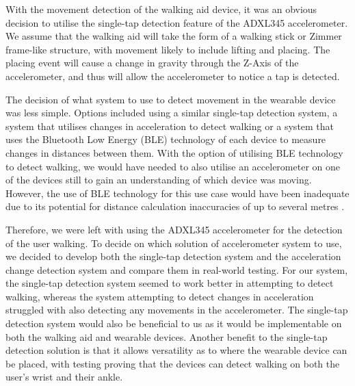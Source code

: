                    With the movement detection of the walking aid device, it was an obvious decision to utilise the single-tap detection feature of the ADXL345 accelerometer. We assume that the walking aid will take the form of a walking stick or Zimmer frame-like structure, with movement likely to include lifting and placing. The placing event will cause a change in gravity through the Z-Axis of the accelerometer, and thus will allow the accelerometer to notice a tap is detected.
        
                   The decision of what system to use to detect movement in the wearable device was less simple. Options included using a similar single-tap detection system, a system that utilises changes in acceleration to detect walking or a system that uses the Bluetooth Low Energy (BLE) technology of each device to measure changes in distances between them. With the option of utilising BLE technology to detect walking, we would have needed to also utilise an accelerometer on one of the devices still to gain an understanding of which device was moving. However, the use of BLE technology for this use case would have been inadequate due to its potential for distance calculation inaccuracies of up to several metres \cite{Fachri_2019}. 
        
                   Therefore, we were left with using the ADXL345 accelerometer for the detection of the user walking. To decide on which solution of accelerometer system to use, we decided to develop both the single-tap detection system and the acceleration change detection system and compare them in real-world testing. For our system, the single-tap detection system seemed to work better in attempting to detect walking, whereas the system attempting to detect changes in acceleration struggled with also detecting any movements in the accelerometer. The single-tap detection system would also be beneficial to us as it would be implementable on both the walking aid and wearable devices. Another benefit to the single-tap detection solution is that it allows versatility as to where the wearable device can be placed, with testing proving that the devices can detect walking on both the user's wrist and their ankle. 
        
